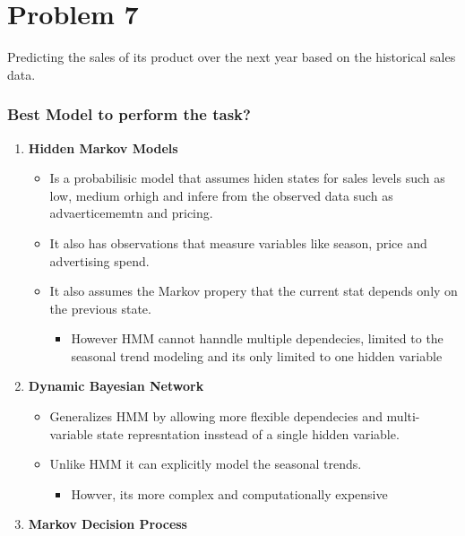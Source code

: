 \documentclass{article}
\begin{document}
\clearpage
\section*{Problem 7}
Predicting the sales of its product over the next year based on the historical sales data. 
\subsubsection*{Best Model to perform the task?}
\begin{enumerate}
    \item \textbf{Hidden Markov Models}
    \begin{itemize}
        \item Is a probabilisic model that assumes hiden states for sales levels such as low, medium orhigh and infere from the observed data such as advaerticememtn and pricing.
        \item It also has observations that measure variables like season, price and advertising spend.
        \item It also assumes the Markov propery that the current stat depends only on the previous state.
        \begin{itemize}
            \item However HMM cannot hanndle multiple dependecies, limited to the seasonal trend modeling and its only limited to one hidden variable
        \end{itemize}
    \end{itemize}
    

    \item \textbf{Dynamic Bayesian Network}
    \begin{itemize}
        \item Generalizes HMM by allowing more flexible dependecies and multi-variable state represntation insstead of a single hidden variable.
        \item Unlike HMM it can explicitly model the seasonal trends.
        \begin{itemize}
            \item Howver, its more complex and computationally expensive
        \end{itemize}
    \end{itemize}
    



    \item \textbf{Markov Decision Process}
    

\end{enumerate}
\end{document}
